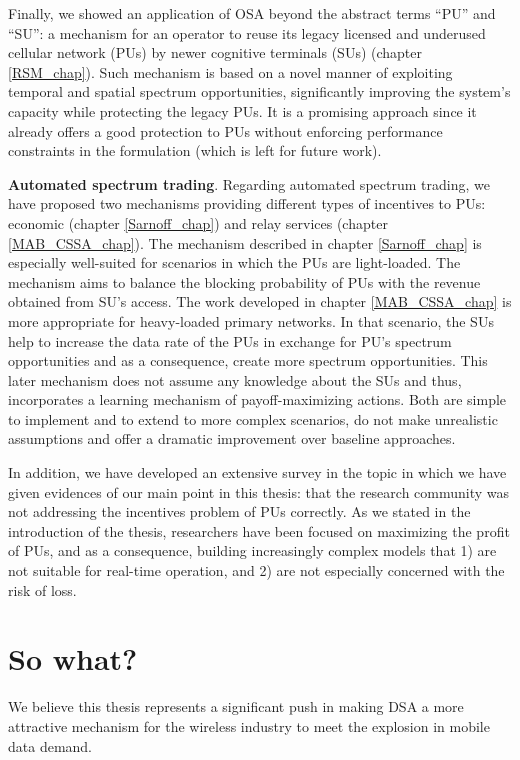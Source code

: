 Finally, we showed an application of OSA beyond the abstract terms \enquote{PU} and \enquote{SU}: a mechanism for an operator to reuse its legacy licensed and underused cellular network (PUs) by newer cognitive terminals (SUs) (chapter \ref{RSM_chap}). Such mechanism is based on a novel manner of exploiting temporal and spatial spectrum opportunities, significantly improving the system's capacity while protecting the legacy PUs. It is a promising approach since it already offers a good protection to PUs without enforcing performance constraints in the formulation (which is left for future work).

\textbf{Automated spectrum trading}. Regarding automated spectrum trading, we have proposed two mechanisms providing different types of incentives to PUs: economic (chapter \ref{Sarnoff_chap}) and relay services (chapter \ref{MAB_CSSA_chap}). The mechanism described in chapter \ref{Sarnoff_chap} is especially well-suited for scenarios in which the PUs are light-loaded. The mechanism aims to balance the blocking probability of PUs with the revenue obtained from SU's access. The work developed in chapter \ref{MAB_CSSA_chap} is more appropriate for heavy-loaded primary networks. In that scenario, the SUs help to increase the data rate of the PUs in exchange for PU's spectrum opportunities and as a consequence, create more spectrum opportunities. This later mechanism does not assume any knowledge about the SUs and thus, incorporates a learning mechanism of payoff-maximizing actions. Both are simple to implement and to extend to more complex scenarios, do not make unrealistic assumptions and offer a dramatic improvement over baseline approaches. %

In addition, we have developed an extensive survey in the topic in which we have given evidences of our main point in this thesis: that the research community was not addressing the incentives problem of PUs correctly. As we stated in the introduction of the thesis, researchers have been focused on maximizing the profit of PUs, and as a consequence, building increasingly complex models that 1) are not suitable for real-time operation, and 2) are not especially concerned with the risk of loss.

\section{So what?} %
We believe this thesis represents a significant push in making DSA a more attractive mechanism for the wireless industry to meet the explosion in mobile data demand. 

